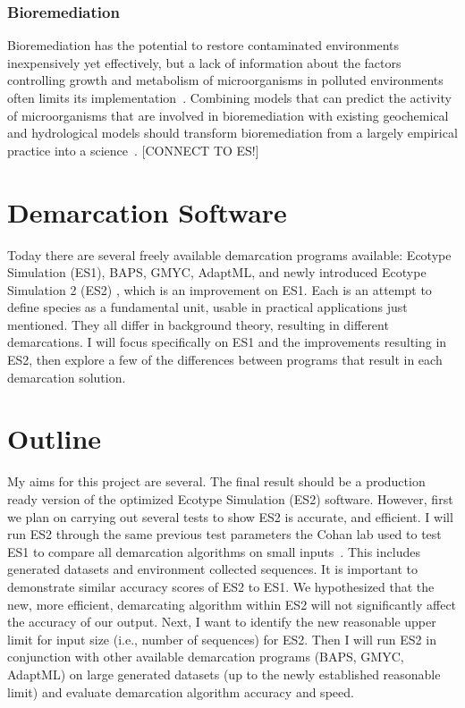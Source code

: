 \subsubsection*{Bioremediation}
Bioremediation has the potential to restore contaminated environments inexpensively yet effectively, but a lack of information about the factors controlling growth and metabolism of microorganisms in polluted environments often limits its implementation~\cite{lovley2003cleaning}.
Combining models that can predict the activity of microorganisms that are involved in bioremediation with existing geochemical and hydrological models should transform bioremediation from a largely empirical practice into a science~\cite{lovley2003cleaning}. [CONNECT TO ES!]

\section{Demarcation Software}
Today there are several freely available demarcation programs available: Ecotype Simulation (ES1), BAPS, GMYC, AdaptML, and newly introduced Ecotype Simulation 2 (ES2) , which is an improvement on ES1.
Each is an attempt to define species as a fundamental unit, usable in practical applications just mentioned.
They all differ in background theory, resulting in different demarcations.
I will focus specifically on ES1 and the improvements resulting in ES2, then explore a few of the differences between programs that result in each demarcation solution.


\section{Outline}
My aims for this project are several.
The final result should be a production ready version of the optimized Ecotype Simulation (ES2) software.
However, first we plan on carrying out several tests to show ES2 is accurate, and efficient.
I will run ES2 through the same previous test parameters the Cohan lab used to test ES1 to compare all demarcation algorithms on small inputs~\cite{carlo}.
This includes generated datasets and environment collected sequences.
It is important to demonstrate similar accuracy scores of ES2 to ES1.
We hypothesized that the new, more efficient, demarcating algorithm within ES2 will not significantly affect the accuracy of our output.
Next, I want to identify the new reasonable upper limit for input size (i.e., number of sequences) for ES2.
Then I will run ES2 in conjunction with other available demarcation programs (BAPS, GMYC, AdaptML) on large generated datasets (up to the newly established reasonable limit) and evaluate demarcation algorithm accuracy and speed.

